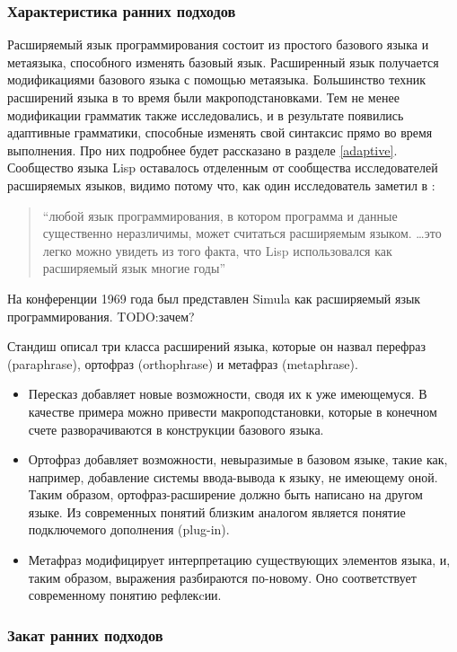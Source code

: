 \documentclass[a4paper,12pt]{article}
\begin{document}
\subsubsection{Характеристика ранних подходов}

Расширяемый язык программирования состоит из простого базового языка и
метаязыка, способного изменять базовый язык. Расширенный язык получается
модификациями базового языка с помощью метаязыка. Большинство техник расширений
языка в то время были макроподстановками. Тем не менее модификации грамматик 
также исследовались, и в результате появились адаптивные грамматики, способные
изменять свой синтаксис прямо во время выполнения. Про них подробнее будет 
рассказано в разделе \ref{adaptive}. Сообщество языка Lisp оставалось отделенным
от сообщества исследователей расширяемых языков, видимо потому что, как один
исследователь заметил в \cite{harr60}:
\begin{quote}
``любой язык программирования, в котором программа и данные существенно
неразличимы, может считаться расширяемым языком. \ldots это легко можно увидеть
из того факта, что Lisp использовался как расширяемый язык многие годы''
\end{quote}
На конференции 1969 года был представлен Simula как расширяемый язык
программирования. TODO:зачем?

Стандиш описал три класса расширений языка, которые он назвал перефраз
(paraphrase), ортофраз (orthophrase) и метафраз (metaphrase).
\begin{itemize}
  \item Пересказ добавляет новые возможности, сводя их к уже имеющемуся. В
  качестве примера можно привести макроподстановки, которые в конечном счете
  разворачиваются в конструкции базового языка.
  \item Ортофраз добавляет возможности, невыразимые в базовом языке, такие как,
  например, добавление системы ввода-вывода к языку, не имеющему оной. Таким
  образом, ортофраз-расширение должно быть написано на другом языке. Из
  современных понятий близким аналогом является понятие подключемого дополнения
  (plug-in).
  \item Метафраз модифицирует интерпретацию существующих элементов языка, и,
  таким образом, выражения разбираются по-новому. Оно соответствует
  современному понятию рефлекcии.
\end{itemize}

\subsubsection{Закат ранних подходов}
\end{document}
